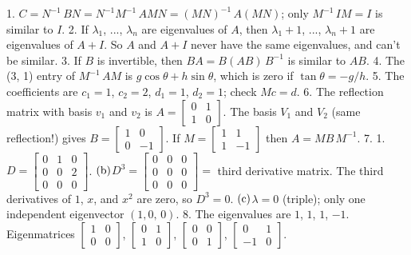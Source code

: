 1. \(C=N^{-1}\,BN=N^{-1}M^{-1}\,AMN=(MN)^{-1}\,A(MN)\); only \(M^{-1}\,IM=I\) is similar to \(I\).
2. If \(\lambda_{1}\), ..., \(\lambda_{n}\) are eigenvalues of \(A\), then \(\lambda_{1}+1\), ..., \(\lambda_{n}+1\) are eigenvalues of \(A+I\). So \(A\) and \(A+I\) never have the same eigenvalues, and can't be similar.
3. If \(B\) is invertible, then \(BA=B(AB)\,B^{-1}\) is similar to \(AB\).
4. The (3, 1) entry of \(M^{-1}\,AM\) is \(g\cos\theta+h\sin\theta\), which is zero if \(\tan\theta=-g/h\).
5. The coefficients are \(c_{1}=1\), \(c_{2}=2\), \(d_{1}=1\), \(d_{2}=1\); check \(Mc=d\).
6. The reflection matrix with basis \(v_{1}\) and \(v_{2}\) is \(A=\left[\begin{matrix}0&1\\ 1&0\end{matrix}\right]\). The basis \(V_{1}\) and \(V_{2}\) (same reflection!) gives \(B=\left[\begin{matrix}1&0\\ 0&-1\end{matrix}\right]\). If \(M=\left[\begin{matrix}1&1\\ 1&-1\end{matrix}\right]\) then \(A=MB\,M^{-1}\).
7. 1. \(D=\left[\begin{matrix}0&1&0\\ 0&0&2\\ 0&0&0\end{matrix}\right]\). \(({\rm b})\)\(D^{3}=\left[\begin{matrix}0&0&0\\ 0&0&0\\ 0&0&0\end{matrix}\right]=\) third derivative matrix. The third derivatives of \(1\), \(x\), and \(x^{2}\) are zero, so \(D^{3}=0\). \(({\rm c})\)\(\lambda=0\) (triple); only one independent eigenvector \((1,0,\,0)\).
8. The eigenvalues are \(1\), \(1\), \(1\), \(-1\). Eigenmatrices \(\left[\begin{matrix}1&0\\ 0&0\end{matrix}\right]\), \(\left[\begin{matrix}0&1\\ 1&0\end{matrix}\right]\), \(\left[\begin{matrix}0&0\\ 0&1\end{matrix}\right]\), \(\left[\begin{matrix}0&1\\ -1&0\end{matrix}\right]\).
